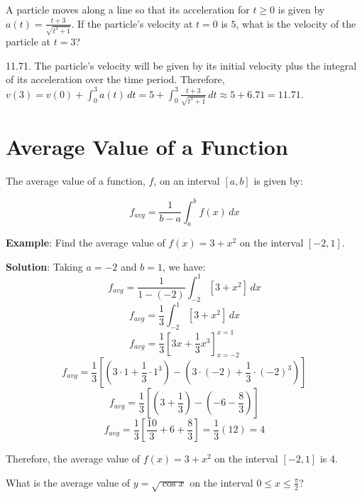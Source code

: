 \begin{Exercise} A particle moves along a 
line so that its acceleration for $t \geq 0$ is given by $a(t) = \frac{t + 3}{
\sqrt{t^3 + 1}}$. If the particle's velocity at $t = 0$ is $5$, what is the 
velocity of the particle at $t = 3$?
\end{Exercise}

\begin{Answer}[ref = defint7]
11.71. The particle's velocity will be given by its initial velocity plus the 
integral of its acceleration over the time period. Therefore, $v(3) = v(0) + 
\int_0^3 a(t)\,dt = 5 + \int_0^3 \frac{t + 3}{\sqrt{t^3 + 1}}\,dt \approx 5 + 
6.71 = 11.71$. 
\end{Answer}

\section{Average Value of a Function}
The average value of a function, $f$, on an interval $\left[ a, b \right]$ is 
given by:
\begin{mdframed}[style=important, frametitle={Average Value of a Function}]
$$f_{avg} = \frac{1}{b - a} \int_a^b f(x)\,dx$$
\end{mdframed}

\textbf{Example}: Find the average value of $f(x) = 3 + x^2$ on the interval 
$[-2, 1]$. 

\textbf{Solution}: Taking $a = -2$ and $b = 1$, we have:
$$f_{avg} = \frac{1}{1 - (-2)} \int_{-2}^1 \left[ 3 + x^2 \right]\,dx$$
$$f_{avg} = \frac{1}{3} \int_{-2}^1 \left[ 3 + x^2 \right]\,dx$$
$$f_{avg} = \frac{1}{3} \left[3x + \frac{1}{3}x^3 \right]_{x = -2}^{x = 1}$$
$$f_{avg} = \frac{1}{3} \left[ \left( 3 \cdot 1 + \frac{1}{3} \cdot 1^3 \right) 
- \left( 3 \cdot (-2) + \frac{1}{3} \cdot (-2)^3 \right) \right]$$
$$f_{avg} = \frac{1}{3} \left[ \left(3 + \frac{1}{3} \right) - \left(-6 - 
\frac{8}{3} \right) \right]$$
$$f_{avg} = \frac{1}{3} \left[ \frac{10}{3} + 6 + \frac{8}{3} \right] = 
\frac{1}{3}(12) = 4$$

Therefore, the average value of $f(x) = 3 + x^2$ on the interval $\left[ -2, 1 
\right]$ is 4. 

\begin{Exercise} What is the average value of 
$y = \sqrt{\cos{x}}$ on the interval $0 \leq x \leq \frac{\pi}{2}$?
\end{Exercise}

